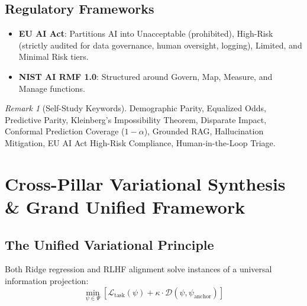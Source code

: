 \documentclass[11pt,a4paper]{article}
\theoremstyle{definition}
\theoremstyle{plain}
\theoremstyle{remark}
\newtheorem*{remark}{Remark}
\begin{document}
\subsection{Regulatory Frameworks}
\begin{itemize}[noitemsep]
    \item \textbf{EU AI Act}: Partitions AI into Unacceptable (prohibited), High-Risk (strictly audited for data governance, human oversight, logging), Limited, and Minimal Risk tiers.
    \item \textbf{NIST AI RMF 1.0}: Structured around Govern, Map, Measure, and Manage functions.
\end{itemize}

\begin{remark}[Self-Study Keywords]
Demographic Parity, Equalized Odds, Predictive Parity, Kleinberg's Impossibility Theorem, Disparate Impact, Conformal Prediction Coverage ($1-\alpha$), Grounded RAG, Hallucination Mitigation, EU AI Act High-Risk Compliance, Human-in-the-Loop Triage.
\end{remark}

\section{Cross-Pillar Variational Synthesis \& Grand Unified Framework}

\subsection{The Unified Variational Principle}
Both Ridge regression and RLHF alignment solve instances of a universal information projection:
\begin{equation}
\min_{\psi \in \Psi} \left[ \mathcal{L}_{\mathrm{task}}(\psi) + \kappa \cdot \mathcal{D}(\psi, \psi_{\mathrm{anchor}}) \right]
\end{equation}
\end{document}
